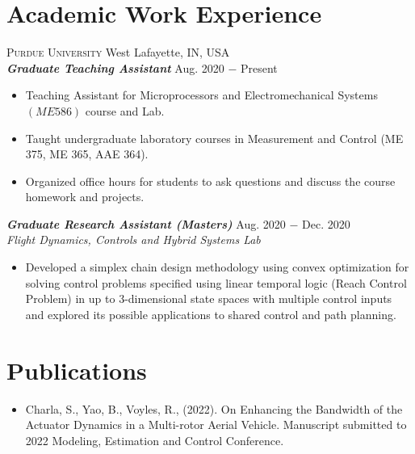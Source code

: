 \documentclass[letterpaper,10pt]{article}
\begin{document}
\section{Academic Work Experience}
\noindent \textsc{Purdue University} \hfill West Lafayette, IN, USA \\
\vspace{3pt}
\noindent \textbf{\textit{Graduate Teaching Assistant}} \hfill Aug. 2020 $-$ Present\\
\begin{itemize}[noitemsep,nolistsep,leftmargin=0.25in,label={--}]
\item Teaching Assistant for Microprocessors and Electromechanical Systems $(ME
586)$ course and Lab.
    \item Taught undergraduate laboratory courses in Measurement and Control (ME 375, ME 365, AAE 364).
    \item Organized office hours for students to ask questions and discuss the course homework and projects.
\end{itemize}
\vspace{3pt}
\noindent \textbf{\textit{Graduate Research Assistant (Masters)}} \hfill Aug. 2020 $-$ Dec. 2020\\
\textit{Flight Dynamics, Controls and Hybrid Systems Lab}
\begin{itemize}[noitemsep,nolistsep,leftmargin=0.25in,label={--}]
	\item Developed a simplex chain design methodology using convex optimization for solving control problems specified using linear temporal logic (Reach Control Problem) in up to 3-dimensional state spaces with multiple control inputs and explored its possible applications to shared control and path planning.
\end{itemize}

\section{Publications}
\begin{itemize}[noitemsep,nolistsep,leftmargin=0.25in,label={}]
\item Charla, S., Yao, B., Voyles, R., (2022). On Enhancing the Bandwidth
of the Actuator Dynamics in a Multi-rotor Aerial Vehicle. Manuscript submitted to 2022 Modeling, Estimation and Control Conference.
\end{itemize}
\end{document}
